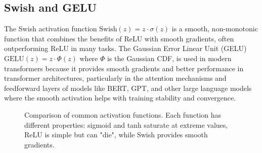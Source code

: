 \subsection{Swish and GELU}

The Swish activation function $\text{Swish}(z) = z \cdot \sigma(z)$ is a smooth, non-monotonic function that combines the benefits of ReLU with smooth gradients, often outperforming ReLU in many tasks. The Gaussian Error Linear Unit (GELU) $\text{GELU}(z) = z \cdot \Phi(z)$ where $\Phi$ is the Gaussian CDF, is used in modern transformers because it provides smooth gradients and better performance in transformer architectures, particularly in the attention mechanisms and feedforward layers of models like BERT, GPT, and other large language models where the smooth activation helps with training stability and convergence.

\begin{figure}[htbp]
\centering
{}
\caption{Comparison of common activation functions. Each function has different properties: sigmoid and tanh saturate at extreme values, ReLU is simple but can "die", while Swish provides smooth gradients.}
\label{fig:activation-functions}
\end{figure}


